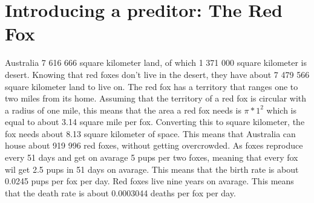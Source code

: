 \documentclass{article}
\begin{document}
\section{Introducing a preditor: The Red Fox}
Australia 7 616 666 square kilometer land, of which 1 371 000 square kilometer is desert. Knowing that red foxes don't live in the desert, they have about 7 479 566 square kilometer land to live on. The red fox has a territory that ranges one to two miles from its home. Assuming that the territory of a red fox is circular with a radius of one mile, this means that the area a red fox needs is $\pi*1^2$ which is equal to about 3.14 square mile per fox. Converting this to square kilometer, the fox needs about 8.13 square kilometer of space. This means that Australia can house about 919 996 red foxes, without getting overcrowded. As foxes reproduce every 51 days and get on avarage 5 pups per two foxes, meaning that every fox wil get 2.5 pups in 51 days on avarage. This means that the birth rate is about 0.0245 pups per fox per day. Red foxes live nine years on avarage. This means that the death rate is about 0.0003044 deaths per fox per day.
\end{document}
